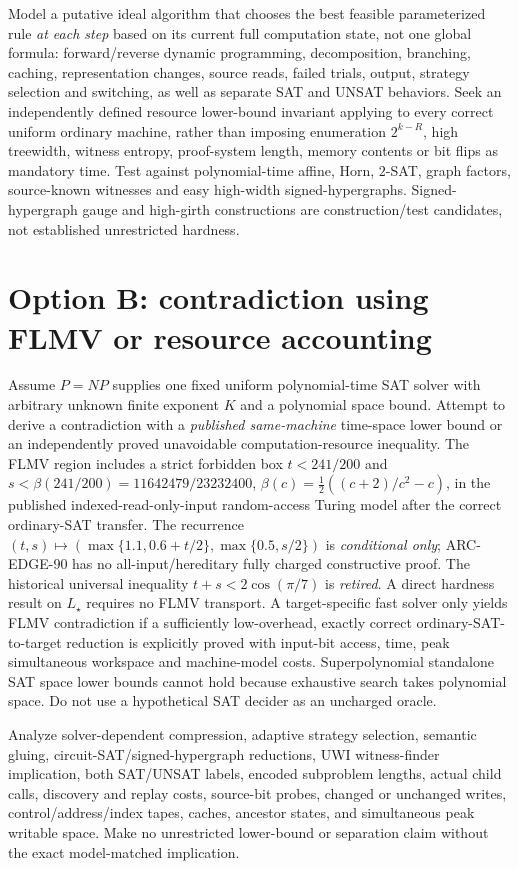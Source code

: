 \documentclass[11pt]{article}
\begin{document}
Model a putative ideal algorithm that chooses the best feasible parameterized rule \emph{at each step} based on its current full computation state, not one global formula: forward/reverse dynamic programming, decomposition, branching, caching, representation changes, source reads, failed trials, output, strategy selection and switching, as well as separate SAT and UNSAT behaviors. Seek an independently defined resource lower-bound invariant applying to every correct uniform ordinary machine, rather than imposing enumeration $2^{k-R}$, high treewidth, witness entropy, proof-system length, memory contents or bit flips as mandatory time. Test against polynomial-time affine, Horn, $2$-SAT, graph factors, source-known witnesses and easy high-width signed-hypergraphs. Signed-hypergraph gauge and high-girth constructions are construction/test candidates, not established unrestricted hardness.

\section*{Option B: contradiction using FLMV or resource accounting}
Assume $P=NP$ supplies one fixed uniform polynomial-time SAT solver with arbitrary unknown finite exponent $K$ and a polynomial space bound. Attempt to derive a contradiction with a \emph{published same-machine} time-space lower bound or an independently proved unavoidable computation-resource inequality. The FLMV region includes a strict forbidden box $t<241/200$ and $s<\beta(241/200)=11642479/23232400$, $\beta(c)=\frac12((c+2)/c^2-c)$, in the published indexed-read-only-input random-access Turing model after the correct ordinary-SAT transfer. The recurrence $(t,s)\mapsto(\max\{1.1,0.6+t/2\},\max\{0.5,s/2\})$ is \emph{conditional only}; ARC-EDGE-90 has no all-input/hereditary fully charged constructive proof. The historical universal inequality $t+s<2\cos(\pi/7)$ is \emph{retired}. A direct hardness result on $L_\star$ requires no FLMV transport. A target-specific fast solver only yields FLMV contradiction if a sufficiently low-overhead, exactly correct ordinary-SAT-to-target reduction is explicitly proved with input-bit access, time, peak simultaneous workspace and machine-model costs. Superpolynomial standalone SAT space lower bounds cannot hold because exhaustive search takes polynomial space. Do not use a hypothetical SAT decider as an uncharged oracle.

Analyze solver-dependent compression, adaptive strategy selection, semantic gluing, circuit-SAT/signed-hypergraph reductions, UWI witness-finder implication, both SAT/UNSAT labels, encoded subproblem lengths, actual child calls, discovery and replay costs, source-bit probes, changed or unchanged writes, control/address/index tapes, caches, ancestor states, and simultaneous peak writable space. Make no unrestricted lower-bound or separation claim without the exact model-matched implication.
\end{document}
